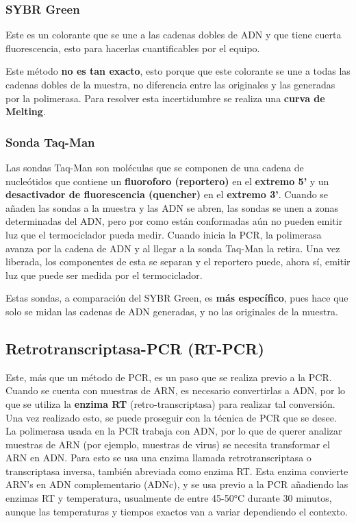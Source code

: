 \subsubsection{SYBR Green}

Este es un colorante que se une a las cadenas dobles de ADN y que tiene cuerta fluorescencia, esto para hacerlas cuantificables por el equipo.

Este método \textbf{no es tan exacto}, esto porque que este colorante se une a todas las cadenas dobles de la muestra, no diferencia entre las originales y las generadas por la polimerasa. Para resolver esta incertidumbre se realiza una \textbf{curva de Melting}.

\subsubsection{Sonda Taq-Man}

Las sondas Taq-Man son moléculas que se componen de una cadena de nucleótidos que contiene un \textbf{fluoroforo (reportero)} en el \textbf{extremo 5'} y un \textbf{desactivador de fluorescencia (quencher)} en el \textbf{extremo 3'}.
Cuando se añaden las sondas a la muestra y las ADN se abren, las sondas se unen a zonas determinadas del ADN, pero por como están conformadas aún no pueden emitir luz que el termociclador pueda medir. Cuando inicia la PCR, la polimerasa avanza por la cadena de ADN y al llegar a la sonda Taq-Man la retira. Una vez liberada, los componentes de esta se separan y el reportero puede, ahora sí, emitir luz que puede ser medida por el termociclador.

Estas sondas, a comparación del SYBR Green, es \textbf{más específico}, pues hace que solo se midan las cadenas de ADN generadas, y no las originales de la muestra.

\subsection{Retrotranscriptasa-PCR (RT-PCR)}

Este, más que un método de PCR, es un paso que se realiza previo a la PCR. Cuando se cuenta con muestras de ARN, es necesario convertirlas a ADN, por lo que se utiliza la \textbf{enzima RT} (retro-transcriptasa) para realizar tal conversión. Una vez realizado esto, se puede proseguir con la técnica de PCR que se desee. La polimerasa usada en la PCR trabaja con ADN, por lo que de querer analizar muestras de ARN (por ejemplo, muestras de virus) se necesita transformar el ARN en ADN. Para esto se usa una enzima llamada retrotranscriptasa o transcriptasa inversa, también abreviada como enzima RT. Esta enzima convierte ARN's en ADN complementario (ADNc), y se usa previo a la PCR añadiendo las enzimas RT y temperatura, usualmente de entre 45-50°C durante 30 minutos, aunque las temperaturas y tiempos exactos van a variar dependiendo el contexto.

